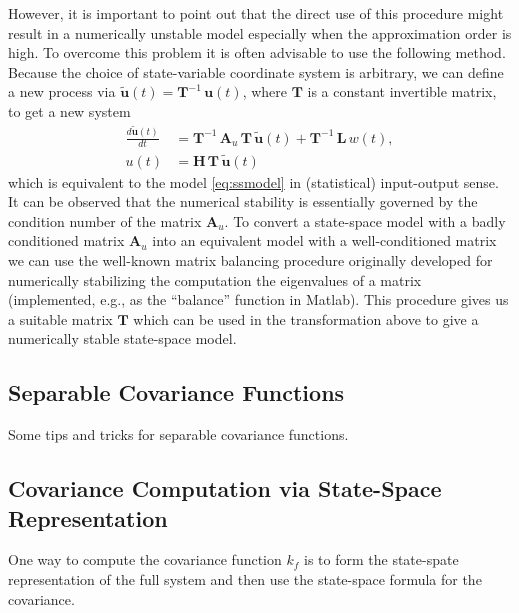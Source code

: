 \documentclass[journal]{IEEEtran}
\newcommand{\simo}[1]{{\color{red}#1}}
\begin{document}
However, it is important to point out that the direct use of this procedure might result in a numerically unstable model especially when the approximation order is high. To overcome this problem it is often advisable to use the following method. 
Because the choice of state-variable coordinate system is arbitrary, we can define a new process via $\tilde{\mathbf{u}}(t) = \mathbf{T}^{-1} \, \mathbf{u}(t)$, where $\mathbf{T}$ is a constant invertible matrix, to get a new system
%
\begin{equation}
\begin{split}
    \frac{d\tilde{\mathbf{u}}(t)}{dt}
    &= \mathbf{T}^{-1} \, \mathbf{A}_u \, \mathbf{T} \, \tilde{\mathbf{u}}(t)
    + \mathbf{T}^{-1} \, \mathbf{L} \, w(t), \\
   u(t) &= \mathbf{H} \, \mathbf{T} \, \tilde{\mathbf{u}}(t)
\end{split}
\end{equation}
%
which is equivalent to the model \eqref{eq:ssmodel} in (statistical) input-output sense. It can be observed that the numerical stability is essentially governed by the condition number of the matrix $\mathbf{A}_u$. To convert a state-space model with a badly conditioned matrix $\mathbf{A}_u$ into an equivalent model with a well-conditioned matrix we can use the well-known matrix balancing procedure
\cite{Parlett+Reinsch:1971}
originally developed for numerically stabilizing the computation the eigenvalues of a matrix (implemented, e.g., as the ``balance'' function in Matlab). This procedure gives us a suitable matrix $\mathbf{T}$ which can be used in the transformation above to give a numerically stable state-space model.

\subsection{Separable Covariance Functions}
%
\simo{Some tips and tricks for separable covariance functions.}




\subsection{Covariance Computation via State-Space Representation}
%
\simo{One way to compute the covariance function $k_f$ is to form the state-spate representation of the full system and then use the state-space formula for the covariance.}
\end{document}
